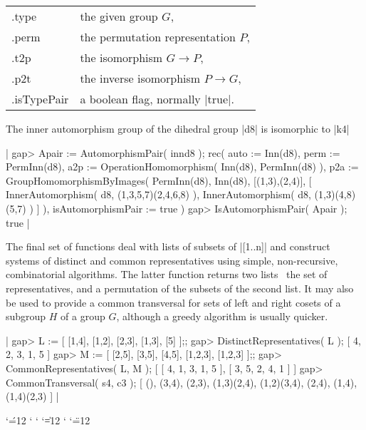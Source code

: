 \begin{tabular}{ll}
.type         &  the given group $G$,                \\
.perm         &  the permutation representation $P$, \\
.t2p          &  the isomorphism  $G \to P$,         \\
.p2t          &  the inverse isomorphism  $P \to G$, \\
.isTypePair   &  a boolean flag, normally |true|.
\end{tabular}

The inner automorphism group of the dihedral group |d8| is 
isomorphic to |k4|\:

|    gap> Apair := AutomorphismPair( innd8 );
    rec(
      auto := Inn(d8),
      perm := PermInn(d8),
      a2p := OperationHomomorphism( Inn(d8), PermInn(d8) ),
      p2a := GroupHomomorphismByImages( PermInn(d8), Inn(d8), [(1,3),(2,4)],
        [ InnerAutomorphism( d8, (1,3,5,7)(2,4,6,8) ), 
          InnerAutomorphism( d8, (1,3)(4,8)(5,7) ) ] ),
      isAutomorphismPair := true )
    gap> IsAutomorphismPair( Apair );
    true   |

The final set of functions deal with lists of subsets of |[1..n]|
and construct systems of distinct and common representatives using
simple, non-recursive, combinatorial algorithms.
The latter function returns two lists\: \ the set of representatives, 
and a permutation of the subsets of the second list.
It may also be used to provide a common transversal
for sets of left and right cosets of a subgroup $H$ of a group $G$,
although a greedy algorithm is usually quicker.

|    gap> L := [ [1,4], [1,2], [2,3], [1,3], [5] ];;
    gap> DistinctRepresentatives( L );
    [ 4, 2, 3, 1, 5 ]
    gap> M := [ [2,5], [3,5], [4,5], [1,2,3], [1,2,3] ];;
    gap> CommonRepresentatives( L, M );
    [ [ 4, 1, 3, 1, 5 ], [ 3, 5, 2, 4, 1 ] ]
    gap> CommonTransversal( s4, c3 );
    [ (), (3,4), (2,3), (1,3)(2,4), (1,2)(3,4), (2,4), (1,4), (1,4)(2,3) ] |

\newpage

\begin{sloppypar}

\newcommand{\ignore}[1]{}
\catcode`\'=12 \catcode` \catcode`
\catcode`\|=12 \catcode` \catcode`\"=12

\end{sloppypar}




